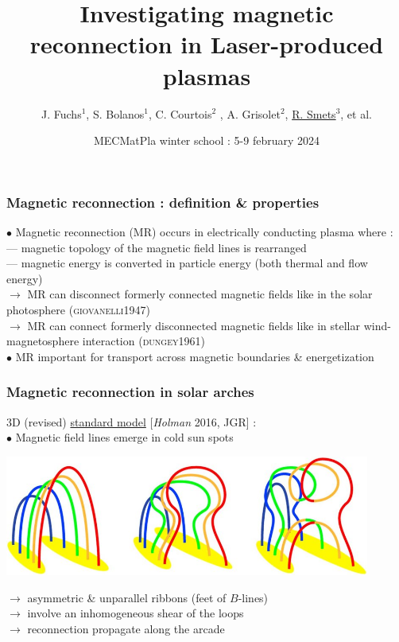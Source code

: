 \documentclass{beamer}
\title{Investigating magnetic reconnection in Laser-produced plasmas}
\author{J. Fuchs$^1$, S. Bolanos$^1$, C. Courtois$^2$ , A. Grisolet$^2$, \underline{R. Smets}$^3$, et al.}
\institute{$^1$LULI, $^2$CEA, $^3$LPP...}
\date{MECMatPla winter school : 5-9 february 2024}
\begin{document}
\frame{\titlepage}



\begin{frame}
\frametitle{Magnetic reconnection : definition \& properties}

$\bullet$ Magnetic reconnection (MR) occurs in electrically conducting plasma where : \\[0.2cm]
--- magnetic topology of the magnetic field lines is rearranged \\
--- magnetic energy is converted in particle energy (both thermal and flow energy) \\[0.4cm]

$\to$ MR can disconnect formerly connected magnetic fields like in the solar photosphere (\textsc{giovanelli1947})\\[0.2cm]
$\to$ MR can connect formerly disconnected magnetic fields like in stellar wind-magnetosphere interaction (\textsc{dungey1961}) \\[0.4cm]

$\bullet$ MR important for transport across magnetic boundaries \& energetization 

\end{frame}



\begin{frame}
\frametitle{Magnetic reconnection in solar arches}

3D (revised) \underline{standard model} [\textit{Holman} 2016, JGR] : \\[0.4cm]
$\bullet$ Magnetic field lines emerge in cold sun spots

\begin{center}
\includegraphics[width=0.9\textwidth]{standard_model.jpg}
\end{center}

$\to$ asymmetric \& unparallel ribbons (feet of $B$-lines) \\
$\to$ involve an inhomogeneous shear of the loops \\
$\to$ reconnection propagate along the arcade \\

\end{frame}
\end{document}

